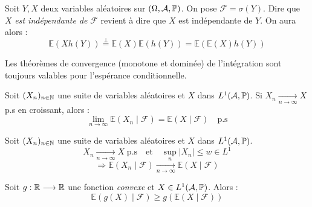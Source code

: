 \begin{remark}
    Soit $Y,X$ deux variables aléatoires sur $( \Omega, \mathcal{A}, \mathbb{P})$. 
    On pose $ \mathcal{F} = \sigma(Y)$. Dire que $X$ \emph{est indépendante de} $ \mathcal{F} $
    revient à dire que $X$ est indépendante de $Y$. On aura alors : 
        $$ \mathbb{E}(X h(Y)) \overset{\perp}{=} \mathbb{E}(X) \mathbb{E}(h(Y)) = \mathbb{E}( \mathbb{E}(X) h(Y) ) $$    
\end{remark}

Les théorèmes de convergence (monotone et dominée) de l'intégration sont toujours valables pour l'espérance 
conditionnelle. 

\begin{theorem}
    Soit $(X_n)_{n \in \mathbb{N}}$ une suite de variables aléatoires et $X$ dans $L^1( \mathcal{A}, \mathbb{P})$. 
    Si $X_n \underset{n \to \infty}{\longrightarrow} X$ p.s en croissant, alors : 
        $$ \boxed{\lim_{n \to \infty} \mathbb{E}(X_n \mid \mathcal{F}) = \mathbb{E}(X \mid \mathcal{F} )} \quad \text{p.s}  $$
\end{theorem}

\begin{theorem}
    Soit $(X_n)_{n \in \mathbb{N}}$ une suite de variables aléatoires et $X$ dans $L^1( \mathcal{A}, \mathbb{P})$. 
        $$ X_n \underset{n \to \infty}{\longrightarrow} X \; \text{p.s} \quad \text{{et}} \quad  \sup_n |X_n| \leqslant w \in L^1 $$ 
        $$ \Longrightarrow \mathbb{E}(X_n \mid \mathcal{F} ) \underset{n \to \infty}{\longrightarrow} \mathbb{E}(X \mid \mathcal{F} ) $$
\end{theorem}

\begin{theorem}
    Soit $g : \mathbb{R} \longrightarrow \mathbb{R}$ une fonction \emph{convexe} et $X \in L^1( \mathcal{A}, \mathbb{P})$. Alors : 
        $$ \mathbb{E}(g(X) \mid \mathcal{F} ) \geqslant g( \mathbb{E}(X \mid \mathcal{F} ) ) $$ 
\end{theorem}

